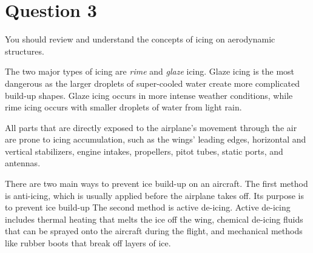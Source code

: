 \section{Question 3}
\begin{importantbox}
    You should review and understand the concepts of icing on aerodynamic structures.
\end{importantbox}

The two major types of icing are \textit{rime} and \textit{glaze} icing. Glaze icing is the most dangerous as the larger droplets of super-cooled water create more complicated build-up shapes. Glaze icing occurs in more intense weather conditions, while rime icing occurs with smaller droplets of water from light rain.

All parts that are directly exposed to the airplane's movement through the air are prone to icing accumulation, such as the wings' leading edges, horizontal and vertical stabilizers, engine intakes, propellers, pitot tubes, static ports, and antennas.

There are two main ways to prevent ice build-up on an aircraft. The first method is anti-icing, which is usually applied before the airplane takes off. Its purpose is to prevent ice build-up The second method is active de-icing. Active de-icing includes thermal heating that melts the ice off the wing, chemical de-icing fluids that can be sprayed onto the aircraft during the flight, and mechanical methods like rubber boots that break off layers of ice. 
